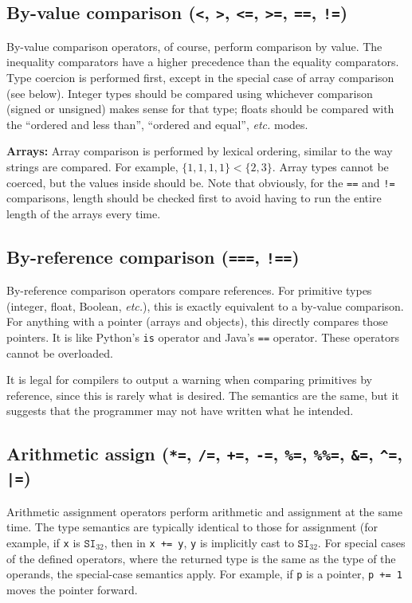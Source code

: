\documentclass{article}
\newcommand{\R}[1]{\mathtt{#1}}
\begin{document}
\subsection{By-value comparison (\texttt{<}, \texttt{>}, \texttt{<=},
  \texttt{>=}, \texttt{==}, \texttt{!=})}
\label{sub:operators:valcomp}
By-value comparison operators, of course, perform comparison by value. The
inequality comparators have a higher precedence than the equality
comparators. Type coercion is performed first, except in the special case of
array comparison (see below). Integer types should be compared using whichever
comparison (signed or unsigned) makes sense for that type; floats should be
compared with the ``ordered and less than'', ``ordered and equal'',
{\it etc.} modes.

\textbf{Arrays:} Array comparison is performed by lexical ordering, similar to
the way strings are compared. For example, $\{1, 1, 1, 1\} < \{2, 3\}$.
Array types cannot be coerced, but the values inside should be. Note that
obviously, for the \texttt{==} and \texttt{!=} comparisons, length should be
checked first to avoid having to run the entire length of the arrays every
time.

\subsection{By-reference comparison (\texttt{===}, \texttt{!==})}
\label{sub:operators:refcomp}
By-reference comparison operators compare references. For primitive types
(integer, float, Boolean, {\it etc.}), this is exactly equivalent to a
by-value comparison. For anything with a pointer (arrays and objects), this
directly compares those pointers. It is like Python's \texttt{is} operator
and Java's \texttt{==} operator. These operators cannot be overloaded.

It is legal for compilers to output a warning when comparing primitives
by reference, since this is rarely what is desired. The semantics are the
same, but it suggests that the programmer may not have written what he
intended.

\subsection{Arithmetic assign (\texttt{*=}, \texttt{/=}, \texttt{+=},
  \texttt{-=}, \texttt{\%=}, \texttt{\%\%=}, \texttt{\&=}, \texttt{\^{}=},
  \texttt{|=})}
\label{sub:operators:arithas}
Arithmetic assignment operators perform arithmetic and assignment at the same
time. The type semantics are typically identical to those for assignment
(for example, if \texttt{x} is $\R{SI}_{32}$, then in
\texttt{x~+=~y}, \texttt{y} is implicitly cast to $\R{SI}_{32}$. For special
cases of the defined operators, where the returned type is the same as the
type of the operands, the special-case semantics apply. For example, if
\texttt{p} is a pointer, \texttt{p~+=~1} moves the pointer forward.
\end{document}
